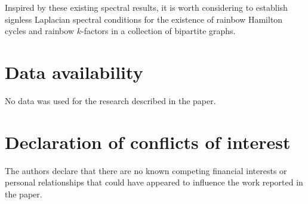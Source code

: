 \documentclass[11pt,a4paper]{article}
\theoremstyle{definition}
\numberwithin{equation}{section}
\begin{document}
Inspired by these existing spectral results, it is worth considering to establish signless Laplacian spectral conditions for the existence of rainbow Hamilton cycles and rainbow $k$-factors in a collection of bipartite graphs.

\section*{Data availability}
No data was used for the research described in the paper.

\section*{Declaration of conflicts of interest}
The authors declare that there are no known competing financial interests or personal relationships that could have appeared to influence the work reported in the paper.
\end{document}
